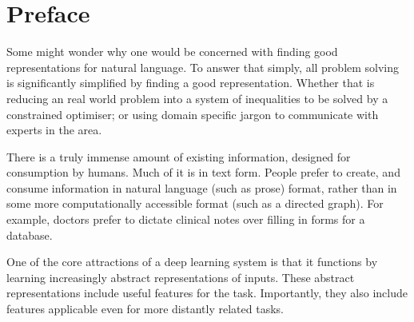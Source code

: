 \documentclass[12pt,parskip]{komatufte}
\begin{document}


\chapter{Preface}\label{sec:introduction}

Some might wonder why one would be concerned with finding good representations for natural language.
To answer that simply, all problem solving is significantly simplified by finding a good representation.
Whether that is reducing an real world problem into a system of inequalities to be solved by a constrained optimiser; or using domain specific jargon to communicate with experts in the area.



There is a truly immense amount of existing information, designed for consumption by humans.
Much of it is in text form.
People prefer to create, and consume information in natural language (such as prose) format,
rather than in some more computationally accessible format (such as a directed graph).
For example, doctors prefer to dictate clinical notes over filling in forms for a database.



One of the core attractions of a deep learning system is that it functions by learning increasingly abstract representations of inputs.
These abstract representations include useful features for the task.
Importantly, they also include features applicable even for more distantly related tasks.
\end{document}

